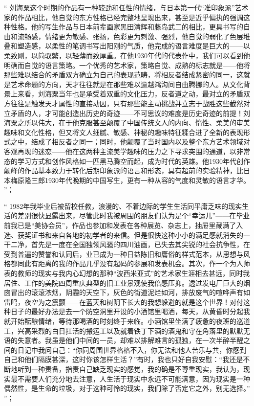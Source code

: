 \documentclass[master,oneside]{zjuthesis}
\begin{document}
“ 刘海粟这个时期的作品有一种较劲和任性的情绪，与日本第一代“准印象派”艺术家的作品相比，他自觉的东方性格已经完整地呈现出来，甚至是近乎偏执的强调这种性格。他的写生作品与日本前辈画家黑田清辉和藤岛武二的相比，更具书写的自由和流畅感，情绪更为敏感、张扬，色彩更为刺激、强烈，他自觉的弱化了色层堆叠和塑造感，以柔性的笔调书写出阳刚的气质，他完成的语言难度是巨大的——以柔致刚，以简驭繁，以轻薄而致厚重。在他1930年代的代表作中，我们可以看到他明确而自觉的语言策略。一个优秀的艺术家，策略自觉、成熟的标志就是——他将那些难以结合的矛盾双方确立为自己的表现范畴，将相反者结成紧密的同一，这就是艺术命题的方向，天才往往就是在那些难以逾越鸿沟间自由腾挪的人。从文化背景上来看，刘海粟当年也是承受着双重的文化压力，反者道之动，最对立的矛盾双方往往是触发天才属性的直接动因，只有那些能主动挑战并立志于战胜这些截然对立矛盾的人，才可能创造出历史的奇迹——不可思议的难度是历史奇迹的前提！刘海粟之所以伟大，在于他克服甚至颠覆了中国传统文人的内向、惰性、柔美的审美趣味和文化性格，但又将文人细腻、敏感、神秘的趣味特征糅合进了全新的表现形式之中，结成了相反者之同一；同时，他颠覆了当时国内以及整个东方艺术领域对客观再现的迷恋——他在这两种主流美学趣味的压力之下寻求突围的通道，以非常态的学习方式和创作风格如一匹黑马腾空而起，成为时代的英雄。他1930年代创作颠峰的作品基本致力于转化后期印象派的语言和形态，具有超前的实验精神，比日本梅原隆三郎1930年代晚期的中国写生，更有一种从容的气度和灵敏的语言才华。 ”；

“ 1982年我毕业后被留校任教，浪漫的、不着边际的学生生活同平庸乏味的现实生活的差别很快显露出来，尽管此时我被周围的朋友们认为是个“幸运儿”——在毕业前我已是“美协会员”，作品也参加和发表在各种展览、杂志上，抽屉里藏满了入选、获奖证书和来自各地的初学者的来信。但是很快这种小小的满足感就消失的一干二净，首先是一度在全国独领风骚的四川油画，已失去其尖锐的社会抗争性，在受到普遍的赞誉和认同后，业已成为一种日益陈旧和庸俗的样式范本，从思想与风格都同此有距离的我的作品几乎没有起码的参展和发表机会。其次，作一个为人师表的教师的现实与我内心幻想的那种“波西米亚式”的艺术家生涯相去甚远，同时我居住、工作的美院四周重庆典型的旧工业景观使我倍感压抑。透过发电厂巨大的烟囱冒出的滚滚浓烟，阴霾的天空下，灰色的街道泥烂如河，排放废气的喧哗声有如雷鸣，夜空为之震颤——在蓝天和树阴下长大的我想躲避的就是这个世界！对付这种日子的最好办法是去一个防空洞里开设的小酒馆里喝酒，每天，从黄昏时分起我就开始酝酿情绪，等待那喝酒的时刻终于来临。小酒馆里坐满了疲惫的夜班的巡道工，兴高采烈的白日扛活的搬运工以及就着铁丁下酒的酒鬼和守在角落里的默默无语的失意者。我虽是他们中间的一员，却难以排解难言的孤独，在一次半醉半醒之间的日记中我问自己：“你同周围世界格格不入，你无法和他人苦乐与共，你感到自己和他们隔膜甚深，这时你该怎样生活？”有时，我也只好自我安慰：“我还是不断地听到一种责备，指责自己缺乏现实的感觉，我的确是不尊重现实，我认为，现实最不需要人们充分地去注意，人生活于现实中永远不可能满意，因为现实是一种偶然性，是生命的垃圾，对于这种可怜的现实，我们除了否定它之外，别无选择。” ”；
\end{document}
